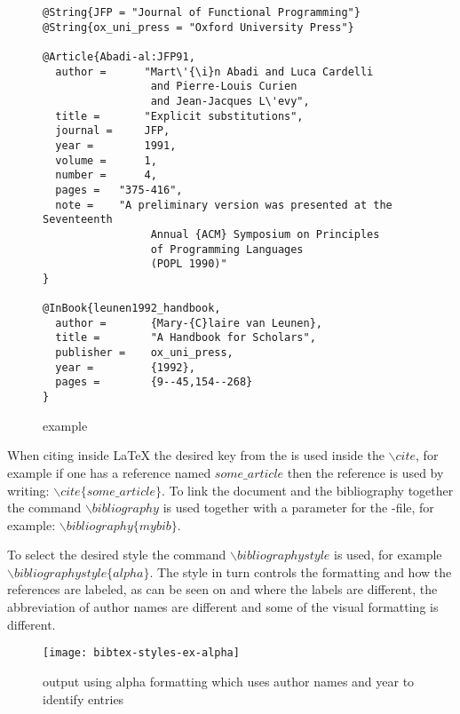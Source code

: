 \begin{figure}[ht]
  \centering
  \begin{small}
\begin{verbatim}
@String{JFP = "Journal of Functional Programming"}
@String{ox_uni_press = "Oxford University Press"}

@Article{Abadi-al:JFP91,
  author =      "Mart\'{\i}n Abadi and Luca Cardelli
                 and Pierre-Louis Curien
                 and Jean-Jacques L\'evy",
  title =       "Explicit substitutions",
  journal =     JFP,
  year =        1991,
  volume =      1,
  number =      4,
  pages =	"375-416",
  note =	"A preliminary version was presented at the Seventeenth
                 Annual {ACM} Symposium on Principles
                 of Programming Languages
                 (POPL 1990)"
}

@InBook{leunen1992_handbook,
  author =       {Mary-{C}laire van Leunen},
  title =        "A Handbook for Scholars",
  publisher =    ox_uni_press,
  year =         {1992},
  pages =        {9--45,154--268}
}
\end{verbatim}
  \end{small}
  \caption{{\bibtex} example}
\label{fig:bibtex_example}
\end{figure}

When citing inside {\LaTeX} the desired key from the {\bibtex} is used
inside the ${\backslash}cite$, for example if one has a reference
named $some\_article$ then the reference is used by writing:
${\backslash}cite\{some\_article\}$.  To link the document and the
bibliography together the command ${\backslash}bibliography$ is used
together with a parameter for the {\bibtex}-file, for example:
${\backslash}bibliography\{mybib\}$.

To select the desired style the command
${\backslash}bibliographystyle$ is used, for example
${\backslash}bibliographystyle\{alpha\}$.  The style in turn controls
the formatting and how the references are labeled, as can be seen on
 and 
where the labels are different, the abbreviation of author names are
different and some of the visual formatting is different.

\begin{figure}[ht]
  \centering
  \texttt{[image: bibtex-styles-ex-alpha]}
  \caption{{\bibtex} output using alpha formatting which uses author
    names and year to identify entries}
\label{fig:bibtex_example_alpha}
\end{figure}


